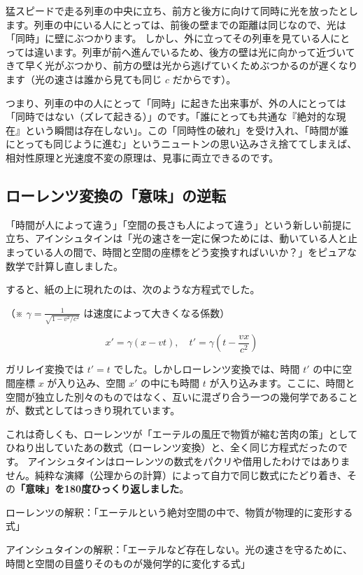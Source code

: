 猛スピードで走る列車の中央に立ち、前方と後方に向けて同時に光を放ったとします。列車の中にいる人にとっては、前後の壁までの距離は同じなので、光は「同時」に壁にぶつかります。 しかし、外に立ってその列車を見ている人にとっては違います。列車が前へ進んでいるため、後方の壁は光に向かって近づいてきて早く光がぶつかり、前方の壁は光から逃げていくためぶつかるのが遅くなります（光の速さは誰から見ても同じ \(c\) だからです）。

つまり、列車の中の人にとって「同時」に起きた出来事が、外の人にとっては「同時ではない（ズレて起きる）」のです。「誰にとっても共通な『絶対的な現在』という瞬間は存在しない」。この「同時性の破れ」を受け入れ、「時間が誰にとっても同じように進む」というニュートンの思い込みさえ捨ててしまえば、相対性原理と光速度不変の原理は、見事に両立できるのです。

\subsection{ローレンツ変換の「意味」の逆転}

「時間が人によって違う」「空間の長さも人によって違う」という新しい前提に立ち、アインシュタインは「光の速さを一定に保つためには、動いている人と止まっている人の間で、時間と空間の座標をどう変換すればいいか？」をピュアな数学で計算し直しました。

すると、紙の上に現れたのは、次のような方程式でした。

（※ \ensuremath{\gamma=\frac{1}{\sqrt{1-v^2/c^2}}} は速度によって大きくなる係数）

\[
x'=\gamma(x-vt),\quad t'=\gamma\left(t-\frac{vx}{c^2}\right)
\]

ガリレイ変換では \(t'=t\) でした。しかしローレンツ変換では、時間 \(t'\) の中に空間座標 \(x\) が入り込み、空間 \(x'\) の中にも時間 \(t\) が入り込みます。ここに、時間と空間が独立した別々のものではなく、互いに混ざり合う一つの幾何学であることが、数式としてはっきり現れています。

これは奇しくも、ローレンツが「エーテルの風圧で物質が縮む苦肉の策」としてひねり出していたあの数式（ローレンツ変換）と、全く同じ方程式だったのです。 アインシュタインはローレンツの数式をパクリや借用したわけではありません。純粋な演繹（公理からの計算）によって自力で同じ数式にたどり着き、その\textbf{「意味」を180度ひっくり返しました}。

ローレンツの解釈：「エーテルという絶対空間の中で、物質が物理的に変形する式」

アインシュタインの解釈：「エーテルなど存在しない。光の速さを守るために、時間と空間の目盛りそのものが幾何学的に変化する式」

